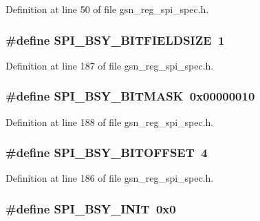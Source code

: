 Definition at line 50 of file gsn\_\-reg\_\-spi\_\-spec.h.

\hypertarget{a00573_ad53cc4c58458552bdbafa8c42fa265bd}{
\subsubsection[{SPI\_\-BSY\_\-BITFIELDSIZE}]{\setlength{\rightskip}{0pt plus 5cm}\#define SPI\_\-BSY\_\-BITFIELDSIZE~1}}
\label{a00573_ad53cc4c58458552bdbafa8c42fa265bd}


Definition at line 187 of file gsn\_\-reg\_\-spi\_\-spec.h.

\hypertarget{a00573_af3a7d37206af7bfa6e2188971e59d6e1}{
\subsubsection[{SPI\_\-BSY\_\-BITMASK}]{\setlength{\rightskip}{0pt plus 5cm}\#define SPI\_\-BSY\_\-BITMASK~0x00000010}}
\label{a00573_af3a7d37206af7bfa6e2188971e59d6e1}


Definition at line 188 of file gsn\_\-reg\_\-spi\_\-spec.h.

\hypertarget{a00573_a935c4a34137e3d94f86974e68481909f}{
\subsubsection[{SPI\_\-BSY\_\-BITOFFSET}]{\setlength{\rightskip}{0pt plus 5cm}\#define SPI\_\-BSY\_\-BITOFFSET~4}}
\label{a00573_a935c4a34137e3d94f86974e68481909f}


Definition at line 186 of file gsn\_\-reg\_\-spi\_\-spec.h.

\hypertarget{a00573_aedf5172adf0f64b6ac2e60377a5f1802}{
\subsubsection[{SPI\_\-BSY\_\-INIT}]{\setlength{\rightskip}{0pt plus 5cm}\#define SPI\_\-BSY\_\-INIT~0x0}}
\label{a00573_aedf5172adf0f64b6ac2e60377a5f1802}


